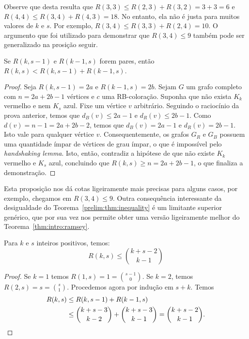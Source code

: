 Observe que desta resulta que $R(3,3) \leq R(2,3) + R(3,2) = 3 + 3 = 6$ e $R(4,4) \leq R(3,4) + R(4,3) = 18$. No entanto, ela não é justa para muitos valores de $k$ e $s$. Por exemplo, $R(3,4) \leq R(3,3) + R(2,4) = 10$. O argumento que foi utilizado para demonstrar que $R(3,4) \leq 9$ também pode ser generalizado na prosição seguir.

\begin{theorem}
\label{prelim:thm:parity}
Se $R(k,s-1)$ e $R(k-1,s)$ forem pares, então
$R(k,s) < R(k,s-1) + R(k-1,s)$.
\end{theorem}
\begin{proof}
Seja $R(k,s-1) = 2a$ e $R(k-1,s) = 2b$.
Sejam $G$ um grafo completo com $n = 2a + 2b -1$ vértices e $c$ uma RB-coloração. Suponha que não exista $K_k$ vermelho e nem $K_s$ azul. Fixe um vértice $v$ arbitrário. Seguindo o raciocínio da prova anterior, temos que $d_B(v) \leq 2a - 1$ e $d_R(v) \leq 2b - 1$. Como $d(v) = n - 1 = 2a + 2b - 2$, temos que $d_B(v) = 2a - 1$ e $d_R(v) = 2b - 1$. Isto vale para qualquer vértice $v$.
Consequentemente, os grafos $G_R$ e $G_B$ possuem uma quantidade ímpar de vértices de grau ímpar, o que é impossível pelo \emph{handshaking lemma}. Isto, então, contradiz a hipótese de que não existe $K_k$ vermelho e $K_s$ azul, concluindo que $R(k,s) \geq n = 2a + 2b -1$, o que finaliza a demonstração.
\end{proof}

Esta proposição nos dá cotas ligeiramente mais precisas para alguns casos, por exemplo, chegamos em $R(3,4) \leq 9$. Outra consequência interessante da desigualdade do Teorema~\ref{prelim:thm:inequality} é um limitante superior genérico, que por sua vez nos permite obter uma versão ligeiramente melhor do Teorema~\ref{thm:intro:ramsey}.

\begin{theorem}
\label{thm:szekeres}
Para $k$ e $s$ inteiros positivos, temos:
\[R(k,s) \leq \binom{k + s - 2}{k - 1}\]
\end{theorem}
\begin{proof}
Se $k = 1$ temos $R(1,s) = 1 = \binom{s - 1}{0}$. Se $k = 2$, temos $R(2,s) = s = \binom{s}{1}$. Procedemos agora por indução em $s + k$. Temos
\begin{align*}
  R(k,s) &\leq R(k,s-1) + R(k-1,s) \\
  &\leq \binom{k + s - 3}{k - 2} + \binom{k + s - 3}{k - 1} = \binom{k + s - 2}{k - 1}. \qedhere
\end{align*}
\end{proof}

